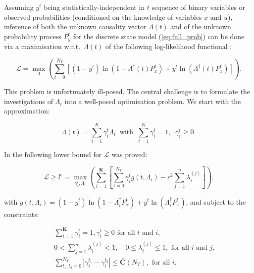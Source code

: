 \documentclass[a0,portrait]{a0poster}
\begin{document}
\begin{multicols}{2}
{\large Assuming $y^t$ being statistically-independent in $t$  sequence of binary variables or observed probabilities (conditioned on the knowledge of variables $x$ and $u$), inference of both the unknown causality vector $\Lambda(t)$ and of the unknown probability process $P_y^t$ for the discrete state model  (\ref{eq:full_prob}) can be done via a maximisation w.r.t.~$\Lambda(t)$ of the following log-likelihood functional :}

\begin{equation}
\label{eq:loglik}
\mathcal{L}=\max_{\Lambda} \left( \sum_{t=0}^{N_T}\left[\left(1-y^t\right)\ln\left(1-\Lambda^{\dagger}(t)P_x^t\right)
+y^t\ln\left(\Lambda^{\dagger}(t)P^t_x\right)\right] \right).
\end{equation}

\noindent
{\large This problem is unfortunately ill-posed.  The central challenge is to formulate the investigations of $\Lambda_i$ into a well-posed optimisation problem.  We start with the approximation:} 

$$\Lambda (t) = \sum_{i=1}^{K} \gamma_i^t \Lambda_i \;\; \mbox{with} \;\; \sum_{i=1}^K \gamma_i^t = 1, \;\; \gamma_i^t \ge 0.$$

\noindent
 {\large In \cite{horenko_pnas_2014} the following lower bound for $\mathcal{L}$ was proved:}

\begin{equation}
\label{eq:loglik_lb}
\mathcal{L} \ge l^\epsilon= \max_{\gamma_i^t,\Lambda_i} \left( \sum_{i=1}^{\mathbf{K}}\left[\sum_{t=0}^{N_T}\gamma^t_i g\left(t,\Lambda_i\right)-\epsilon^2\sum_{j=1}^n\lambda_{i}^{(j)}\right] \right).
\end{equation}

\noindent
{\large with $g\left(t,\Lambda_i\right)=\left(1-y^t\right)\ln\left(1-\Lambda^{\dagger}_iP_x^t\right)+y^t\ln\left(\Lambda^{\dagger}_iP^t_x\right)$, and subject to the constraints:}

\begin{eqnarray}
\label{eq:loglik_lb_con00}
&& \sum_{i=1}^{\mathbf{K}}\gamma_i^t=1,  \gamma_i^t\geq 0 \text{ for all $t$ and $i$,}\\
\label{eq:loglik_lb_con0}
&&0<\sum_{j=1}^n\lambda_{i}^{(j)}< 1,\quad  0\leq\lambda_{i}^{(j)}\leq1, \text{ for all $i$ and $j$,}\\
 \label{eq:loglik_lb_con}
 &&\sum_{t_1,t_2=0}^{N_T}|\gamma_i^{t_1}-\gamma_i^{t_2}|\leq\bar{\mathbf{C}}\left(N_T\right) ,\text{ for all $i$.}
\end{eqnarray}


\end{multicols}
\end{document}

